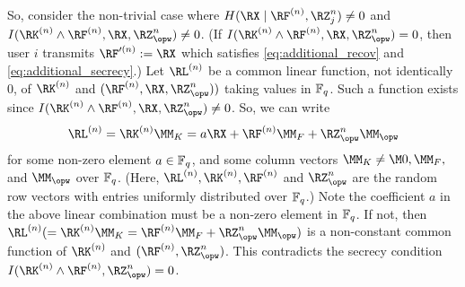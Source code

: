 So, consider the non-trivial case where $H(\RX\mid \RF^{(n)}, \RZ_j^n) \neq 0$ and $I(\RK^{(n)} \wedge \RF^{(n)}, \RX, \RZ_{\opw}^n) \neq 0$. (If $I(\RK^{(n)} \wedge \RF^{(n)}, \RX, \RZ_{\opw}^n)=0$, then user $i$ transmits $\RF'^{(n)}:= \RX$ which satisfies \eqref{eq:additional_recov} and \eqref{eq:additional_secrecy}.)
Let $\RL^{(n)}$ be a common linear function, not identically $0$, of $\RK^{(n)}$ and $(\RF^{(n)}, \RX, \RZ_{\opw}^n))$ taking values in $\mathbb{F}_q$. Such a function exists since $I(\RK^{(n)} \wedge \RF^{(n)}, \RX, \RZ_{\opw}^n) \neq 0$. So, we can write \begin{align}
    \RL^{(n)}=\RK^{(n)}\MM_K= a\RX + \RF^{(n)}\MM_{F}+\RZ_{\opw}^n \MM_{\opw} \label{eq:mcf_lin_perfect}
\end{align}
for some non-zero element $a \in \mathbb{F}_q$, and some  column vectors $\MM_K \neq \M0, \MM_{F},$ and $\MM_{\opw}$ over $\mathbb{F}_q$. (Here, $\RL^{(n)},\RK^{(n)},\RF^{(n)}$ and $\RZ_{\opw}^n$ are the random row vectors with entries uniformly distributed over $\mathbb{F}_q$.) Note  the coefficient $a$ in the above linear combination must be a non-zero element in $\mathbb{F}_q$. If not, then $\RL^{(n)}(=\RK^{(n)}\MM_K= \RF^{(n)}\MM_{F}+\RZ_{\opw}^n \MM_{\opw})$ is a non-constant common function of $\RK^{(n)}$ and $(\RF^{(n)}, \RZ_{\opw}^n)$. This contradicts the secrecy condition $I(\RK^{(n)} \wedge \RF^{(n)},  \RZ_{\opw}^n) = 0$.


